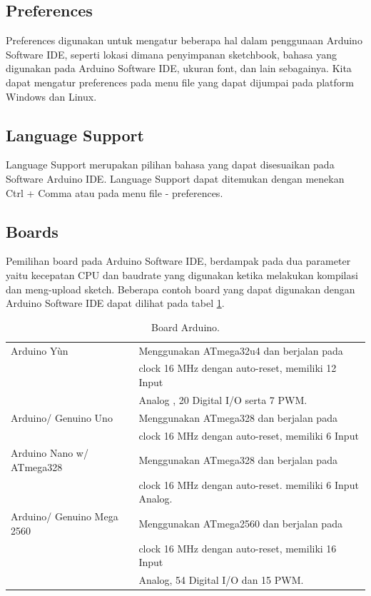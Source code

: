 \subsection{Preferences}
Preferences digunakan untuk mengatur beberapa hal dalam penggunaan Arduino Software IDE, seperti lokasi dimana penyimpanan sketchbook, bahasa yang digunakan pada Arduino Software IDE, ukuran font, dan lain sebagainya. Kita dapat mengatur preferences pada menu file yang dapat dijumpai pada platform Windows dan Linux.

\subsection{Language Support}
Language Support merupakan pilihan bahasa yang dapat disesuaikan pada Software Arduino IDE. Language Support dapat ditemukan dengan menekan Ctrl + Comma atau pada menu file - preferences.

\subsection{Boards}
Pemilihan board pada Arduino Software IDE, berdampak pada dua parameter yaitu kecepatan CPU dan baudrate yang digunakan ketika melakukan kompilasi dan meng-upload sketch. Beberapa contoh board yang dapat digunakan dengan Arduino Software IDE dapat dilihat pada tabel \ref{table:boardarduino}.


\begin{table}[h!]
\centering
\begin{tabular}{ |l|l| }
\hline
Arduino Yùn & Menggunakan ATmega32u4 dan berjalan pada \\
& clock 16 MHz dengan auto-reset, memiliki 12 Input \\
& Analog , 20 Digital I/O serta 7 PWM.\\
\hline
Arduino/ Genuino Uno & Menggunakan ATmega328 dan berjalan pada \\
& clock 16 MHz dengan auto-reset, memiliki 6 Input \\
\hline
Arduino Nano w/ ATmega328 & Menggunakan ATmega328 dan berjalan pada \\
& clock 16 MHz dengan auto-reset. memiliki 6 Input Analog.\\
\hline
Arduino/ Genuino Mega 2560 & Menggunakan ATmega2560 dan berjalan pada \\
& clock 16 MHz dengan auto-reset, memiliki 16 Input \\
& Analog, 54 Digital I/O dan 15 PWM. \\






\hline
\end{tabular}
\caption{Board Arduino.}
\label{table:boardarduino}
\end{table}